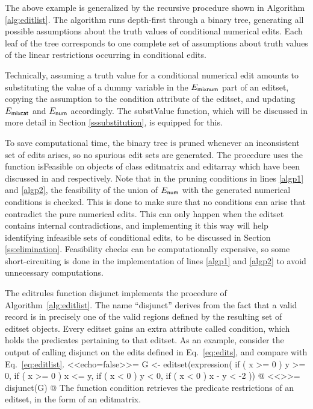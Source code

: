 \documentclass[11pt,fleqn,a4paper]{article}
\begin{document}
The above example is generalized by the recursive procedure shown in Algorithm
\ref{alg:editlist}. The algorithm runs depth-first through a binary tree,
generating all possible assumptions about the truth values of conditional
numerical edits. Each leaf of the tree corresponds to one complete set of
assumptions about truth values of the linear restrictions occurring in
conditional edits.

Technically, assuming a truth value for a conditional numerical edit amounts to
substituting the value of a dummy variable in the $E_{\sf mixnum}$ part of an
{\sf editset}, copying the assumption to the {\sf condition}  attribute of the
{\sf editset}, and updating $E_{\sf mixcat}$ and $E_{\sf num}$ accordingly.
The {\sf substValue} function, which will be discussed in more detail in
Section \ref{sssubstitution}, is equipped for this. 

To save computational time, the binary tree is pruned whenever an inconsistent
set of edits arises, so no spurious edit sets are generated. The procedure uses
the function {\sf isFeasible} on objects of class {\sf editmatrix} and {\sf
editarray} which have been discussed in \cite{jonge:2011} and \cite{loo:2011b}
respectively.  Note that in the pruning conditions in lines \ref{algp1} and
\ref{algp2}, the feasibility of the union of $E_{\sf num}$ with the generated
numerical conditions is checked. This is done to make sure that no conditions
can arise that contradict the pure numerical edits. This can only happen when
the {\sf editset} contains internal contradictions, and implementing it this
way will help identifying infeasible sets of conditional edits, to be discussed
in Section \ref{ss:elimination}. Feasibility checks can be computationally
expensive, so some short-circuiting is done in the implementation of
lines \ref{algp1} and \ref{algp2} to avoid unnecessary computations.


The {\sf editrules} function {\sf disjunct} implements the procedure of
Algorithm~\ref{alg:editlist}. The name ``disjunct'' derives from the fact that a
valid record is in precisely one of the valid regions defined by the resulting
set of {\sf editset} objects.  Every editset gains an extra attribute called
{\sf condition}, which holds the predicates  pertaining to that {\sf editset}.
As an example, consider the output of calling {\sf disjunct} on the edits defined in
Eq.\ \eqref{eq:edits}, and compare with Eq.\ \eqref{eq:editlist}.
<<echo=false>>=
G <- editset(expression(
    if ( x >= 0 ) y >= 0,
    if ( x >= 0 ) x <= y,
    if ( x < 0 ) y < 0,
    if ( x < 0 ) x - y < -2
))
@
<<>>=
disjunct(G)
@
The function {\sf condition} retrieves the predicate restrictions of an {\sf editset},
in the form of an {\sf editmatrix}.
\end{document}
